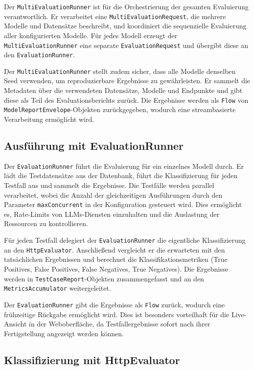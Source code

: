 Der \texttt{MultiEvaluationRunner} ist für die Orchestrierung der gesamten Evaluierung verantwortlich. Er verarbeitet eine \texttt{MultiEvaluationRequest}, die mehrere Modelle und Datensätze beschreibt, und koordiniert die sequenzielle Evaluierung aller konfigurierten Modelle. Für jedes Modell erzeugt der \texttt{MultiEvaluationRunner} eine separate \texttt{EvaluationRequest} und übergibt diese an den \texttt{EvaluationRunner}.

Der \texttt{MultiEvaluationRunner} stellt zudem sicher, dass alle Modelle denselben Seed verwenden, um reproduzierbare Ergebnisse zu gewährleisten. Er sammelt die Metadaten über die verwendeten Datensätze, Modelle und Endpunkte und gibt diese als Teil des Evaluationsberichts zurück. Die Ergebnisse werden als \texttt{Flow} von \texttt{ModelReportEnvelope}-Objekten zurückgegeben, wodurch eine streambasierte Verarbeitung ermöglicht wird.

\subsection*{Ausführung mit EvaluationRunner}

Der \texttt{EvaluationRunner} führt die Evaluierung für ein einzelnes Modell durch. Er lädt die Testdatensätze aus der Datenbank, führt die Klassifizierung für jeden Testfall aus und sammelt die Ergebnisse. Die Testfälle werden parallel verarbeitet, wobei die Anzahl der gleichzeitigen Ausführungen durch den Parameter \texttt{maxConcurrent} in der Konfiguration gesteuert wird. Dies ermöglicht es, Rate-Limits von \acp{LLM}-Diensten einzuhalten und die Auslastung der Ressourcen zu kontrollieren.

Für jeden Testfall delegiert der \texttt{EvaluationRunner} die eigentliche Klassifizierung an den \texttt{HttpEvaluator}. Anschließend vergleicht er die erwarteten mit den tatsächlichen Ergebnissen und berechnet die Klassifikationsmetriken (True Positives, False Positives, False Negatives, True Negatives). Die Ergebnisse werden in \texttt{TestCaseReport}-Objekten zusammengefasst und an den \texttt{MetricsAccumulator} weitergeleitet.

Der \texttt{EvaluationRunner} gibt die Ergebnisse als \texttt{Flow} zurück, wodurch eine frühzeitige Rückgabe ermöglicht wird. Dies ist besonders vorteilhaft für die Live-Ansicht in der Weboberfläche, da Testfallergebnisse sofort nach ihrer Fertigstellung angezeigt werden können.

\subsection*{Klassifizierung mit HttpEvaluator}


